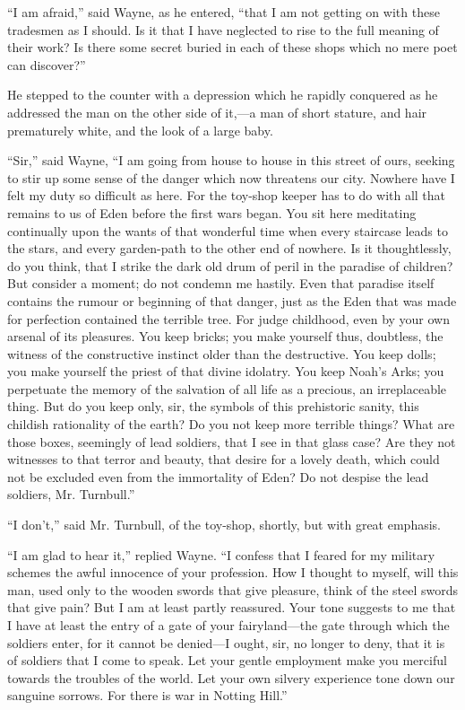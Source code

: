 \documentclass{book}
\begin{document}
“I am afraid,” said Wayne, as he entered, “that I am not getting on with these tradesmen as I should. Is it that I have neglected to rise to the full meaning of their work? Is there some secret buried in each of these shops which no mere poet can discover?”

He stepped to the counter with a depression which he rapidly conquered as he addressed the man on the other side of it,—a man of short stature, and hair prematurely white, and the look of a large baby.

“Sir,” said Wayne, “I am going from house to house in this street of ours, seeking to stir up some sense of the danger which now threatens our city. Nowhere have I felt my duty so difficult as here. For the toy-shop keeper has to do with all that remains to us of Eden before the first wars began. You sit here meditating continually upon the wants of that wonderful time when every staircase leads to the stars, and every garden-path to the other end of nowhere. Is it thoughtlessly, do you think, that I strike the dark old drum of peril in the paradise of children? But consider a moment; do not condemn me hastily. Even that paradise itself contains the rumour or beginning of that danger, just as the Eden that was made for perfection contained the terrible tree. For judge childhood, even by your own arsenal of its pleasures. You keep bricks; you make yourself thus, doubtless, the witness of the constructive instinct older than the destructive. You keep dolls; you make yourself the priest of that divine idolatry. You keep Noah’s Arks; you perpetuate the memory of the salvation of all life as a precious, an irreplaceable thing. But do you keep only, sir, the symbols of this prehistoric sanity, this childish rationality of the earth? Do you not keep more terrible things? What are those boxes, seemingly of lead soldiers, that I see in that glass case? Are they not witnesses to that terror and beauty, that desire for a lovely death, which could not be excluded even from the immortality of Eden? Do not despise the lead soldiers, Mr. Turnbull.”

“I don’t,” said Mr. Turnbull, of the toy-shop, shortly, but with great emphasis.

“I am glad to hear it,” replied Wayne. “I confess that I feared for my military schemes the awful innocence of your profession. How I thought to myself, will this man, used only to the wooden swords that give pleasure, think of the steel swords that give pain? But I am at least partly reassured. Your tone suggests to me that I have at least the entry of a gate of your fairyland—the gate through which the soldiers enter, for it cannot be denied—I ought, sir, no longer to deny, that it is of soldiers that I come to speak. Let your gentle employment make you merciful towards the troubles of the world. Let your own silvery experience tone down our sanguine sorrows. For there is war in Notting Hill.”
\end{document}
